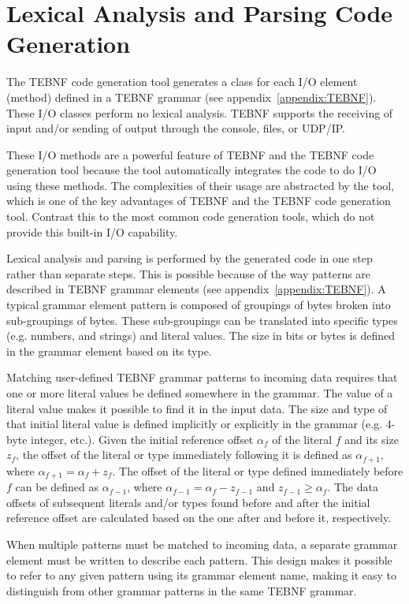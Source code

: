 \section{Lexical Analysis and Parsing Code Generation}
The TEBNF code generation tool generates a class for each I/O element (method) defined in a TEBNF grammar (see appendix~\ref{appendix:TEBNF}).  These I/O classes perform no lexical analysis.  TEBNF supports the receiving of input and/or sending of output through the console, files, or UDP/IP.

\indent
These I/O methods are a powerful feature of TEBNF and the TEBNF code generation tool because the tool automatically integrates the code to do I/O using these methods.  The complexities of their usage are abstracted by the tool, which is one of the key advantages of TEBNF and the TEBNF code generation tool.  Contrast this to the most common code generation tools, which do not provide this built-in I/O capability.

\indent
Lexical analysis and parsing is performed by the generated code in one step rather than separate steps.  This is possible because of the way patterns are described in TEBNF grammar elements (see appendix~\ref{appendix:TEBNF}).  A typical grammar element pattern is composed of groupings of bytes broken into sub-groupings of bytes.  These sub-groupings can be translated into specific types (e.g. numbers, and strings) and literal values.  The size in bits or bytes is defined in the grammar element based on its type.

\indent
Matching user-defined TEBNF grammar patterns to incoming data requires that one or more literal values be defined somewhere in the grammar.  The value of a literal value makes it possible to find it in the input data.  The size and type of that initial literal value is defined implicitly or explicitly in the grammar (e.g. 4-byte integer, etc.).  Given the initial reference offset $ \alpha_f $ of the literal $ f $ and its size $ z_f $, the offset of the literal or type immediately following it is defined as $ \alpha_{f+1} $, where $ \alpha_{f+1} = \alpha_f + z_f $.  The offset of the literal or type defined immediately before $ f $ can be defined as $ \alpha_{f-1} $, where $ \alpha_{f-1} = \alpha_f {-} z_{f-1} $ and $ z_{f-1} \geq \alpha_f $.  The data offsets of subsequent literals and/or types found before and after the initial reference offset are calculated based on the one after and before it, respectively.

\indent
When multiple patterns must be matched to incoming data, a separate grammar element must be written to describe each pattern.  This design makes it possible to refer to any given pattern using its grammar element name, making it easy to distinguish from other grammar patterns in the same TEBNF grammar.

